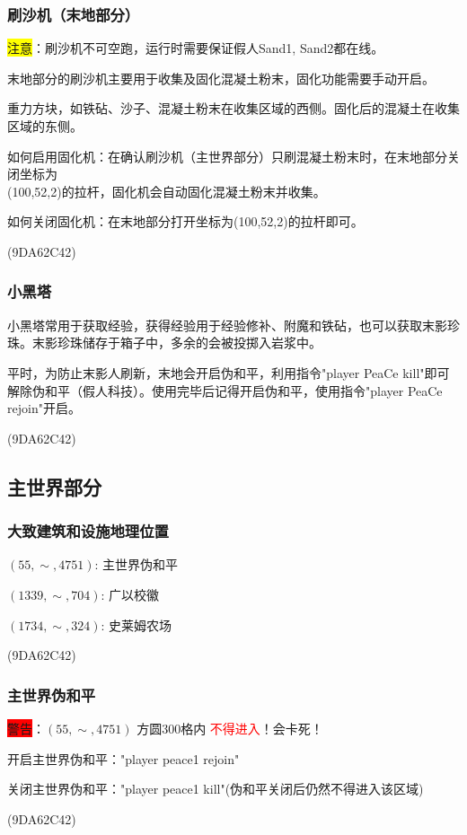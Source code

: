 \documentclass[UTF8,a4paper]{article}
\begin{document}
			\subsubsection{刷沙机（末地部分）}
				\par \colorbox{yellow}{注意}：刷沙机不可空跑，运行时需要保证假人Sand1, Sand2都在线。
				\par 末地部分的刷沙机主要用于收集及固化混凝土粉末，固化功能需要手动开启。
				\par 重力方块，如铁砧、沙子、混凝土粉末在收集区域的西侧。固化后的混凝土在收集区域的东侧。
				\par 如何启用固化机：在确认刷沙机（主世界部分）只刷混凝土粉末时，在末地部分关闭坐标为 \\ (100,52,2)的拉杆，固化机会自动固化混凝土粉末并收集。
				\par 如何关闭固化机：在末地部分打开坐标为(100,52,2)的拉杆即可。
				\begin{flushright}(9DA62C42)\end{flushright}
			\subsubsection{小黑塔}
				\par 小黑塔常用于获取经验，获得经验用于经验修补、附魔和铁砧，也可以获取末影珍珠。末影珍珠储存于箱子中，多余的会被投掷入岩浆中。
				\par 平时，为防止末影人刷新，末地会开启伪和平，利用指令"player PeaCe kill"即可解除伪和平（假人科技）。使用完毕后记得开启伪和平，使用指令"player PeaCe rejoin"开启。
				\begin{flushright}(9DA62C42)\end{flushright}
		\subsection{主世界部分}
			\subsubsection{大致建筑和设施地理位置}
				\par $(55,\sim,4751)$: 主世界伪和平
				\par $(1339,\sim,704)$: 广以校徽
				\par $(1734,\sim,324)$: 史莱姆农场
				\begin{flushright}(9DA62C42)\end{flushright}
			\subsubsection{主世界伪和平}
				\par \colorbox{red}{警告}：$(55,\sim,4751)$ 方圆300格内 \textcolor{red}{不得进入}！会卡死！
				\par 开启主世界伪和平："player peace1 rejoin"
				\par 关闭主世界伪和平："player peace1 kill"(伪和平关闭后仍然不得进入该区域)
				\begin{flushright}(9DA62C42)\end{flushright}
\end{document}

